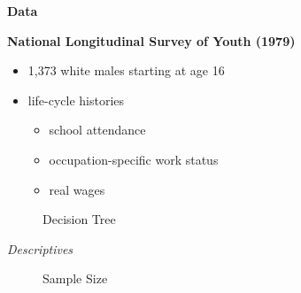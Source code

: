 \begin{frame}\begin{center}
\LARGE\textbf{Data}
\end{center}\end{frame}
\begin{frame}
\textbf{National Longitudinal Survey of Youth (1979)}\vspace{0.5cm}
\begin{itemize}\setlength\itemsep{1em}
\item 1,373 white males starting at age 16
\item life-cycle histories\medskip
\begin{itemize}\setlength\itemsep{1em}
\item school attendance
\item occupation-specific work status
\item real wages
\end{itemize}
\end{itemize}
\end{frame}
\begin{frame}
\begin{figure}\caption{Decision Tree}
\scalebox{0.80}{}
\end{figure}
\end{frame}
\begin{frame}\begin{center}
\LARGE\textit{Descriptives}
\end{center}\end{frame}
\begin{frame}
\begin{figure}\caption{Sample Size}
\end{figure}
\end{frame}
